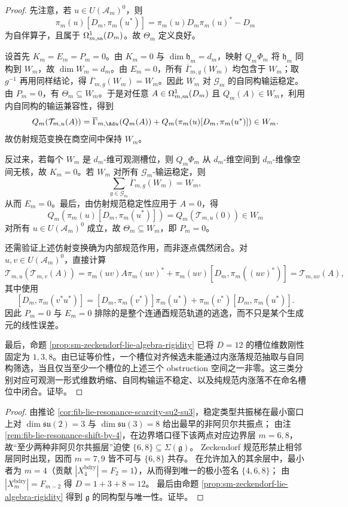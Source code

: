 \begin{proof}
先注意，若 \(u\in U(\mathcal A_m)^0\)，则
\[
\pi_m(u)[D_m,\pi_m(u^*)]
=\pi_m(u)D_m\pi_m(u)^*-D_m
\]
为自伴算子，且属于 \(\Omega^1_{m,{\rm sa}}(D_m)\)。故 \(\Theta_m\) 定义良好。

设首先 \(K_m=E_m=P_m=0\)。由 \(K_m=0\) 与 \(\dim\mathfrak h_m=d_m\)，映射 \(Q_m\Phi_m\) 将 \(\mathfrak h_m\) 同构到 \(W_m\)，故 \(\dim W_m=d_m\)。由 \(E_m=0\)，所有 \(\overline\Gamma_{m,g}(W_m)\) 均包含于 \(W_m\)；取 \(g^{-1}\) 再用同样结论，得 \(\overline\Gamma_{m,g}(W_m)=W_m\)。因此 \(W_m\) 对 \(\mathcal G_m\) 的自同构输运稳定。由 \(P_m=0\)，有 \(\Theta_m\subseteq W_m\)。于是对任意 \(A\in\Omega^1_{m,{\rm sa}}(D_m)\) 且 \(Q_m(A)\in W_m\)，利用内自同构的输运兼容性，得到
\[
Q_m(\mathcal T_{m,u}(A))
=\overline\Gamma_{m,\Ad u}(Q_m(A))+Q_m(\pi_m(u)[D_m,\pi_m(u^*)])\in W_m.
\]
故仿射规范变换在商空间中保持 \(W_m\)。

反过来，若每个 \(W_m\) 是 \(d_m\)-维可观测槽位，则 \(Q_m\Phi_m\) 从 \(d_m\)-维空间到 \(d_m\)-维像空间无核，故 \(K_m=0\)。若 \(W_m\) 对所有 \(\mathcal G_m\)-输运稳定，则
\[
\sum_{g\in\mathcal G_m}\overline\Gamma_{m,g}(W_m)=W_m,
\]
从而 \(E_m=0\)。最后，由仿射规范稳定性应用于 \(A=0\)，得
\[
Q_m(\pi_m(u)[D_m,\pi_m(u^*)])=Q_m(\mathcal T_{m,u}(0))\in W_m
\]
对所有 \(u\in U(\mathcal A_m)^0\) 成立，故 \(\Theta_m\subseteq W_m\)，即 \(P_m=0\)。

还需验证上述仿射变换确为内部规范作用，而非逐点偶然闭合。对 \(u,v\in U(\mathcal A_m)^0\)，直接计算
\[
\mathcal T_{m,u}(\mathcal T_{m,v}(A))
=\pi_m(uv)A\pi_m(uv)^*+\pi_m(uv)[D_m,\pi_m((uv)^*)]
=\mathcal T_{m,uv}(A),
\]
其中使用
\[
[D_m,\pi_m(v^*u^*)]=[D_m,\pi_m(v^*)]\pi_m(u^*)+\pi_m(v^*)[D_m,\pi_m(u^*)].
\]
因此 \(P_m=0\) 与 \(E_m=0\) 排除的是整个连通酉规范轨道的逃逸，而不只是某个生成元的线性误差。

最后，命题 \ref{prop:sm-zeckendorf-lie-algebra-rigidity} 已将 \(D=12\) 的槽位维数刚性固定为 \(1,3,8\)。由已证等价性，一个槽位对齐候选未能通过内涨落规范抽取与自同构筛选，当且仅当至少一个槽位的上述三个 obstruction 空间之一非零。这三类分别对应可观测一形式维数坍缩、自同构输运不稳定、以及纯规范内涨落不在命名槽位中闭合。证毕。
\end{proof}

\begin{proof}
由推论 \ref{cor:fib-lie-resonance-scarcity-su2-su3}，稳定类型共振梯在最小窗口上对 \(\dim\mathfrak{su}(2)=3\) 与 \(\dim\mathfrak{su}(3)=8\) 给出最早的非阿贝尔共振点；
由注 \ref{rem:fib-lie-resonance-shift-by-4}，在边界塔口径下该两点对应边界层 \(m=6,8\)，故“至少两种非阿贝尔共振层”迫使 \(\{6,8\}\subseteq\Sigma(\mathfrak g)\)。
Zeckendorf 规范形禁止相邻层同时出现，因而 \(m=7,9\) 皆不可与 \(\{6,8\}\) 共存。
在允许加入的其余层中，最小者为 \(m=4\)（贡献 \(|X_4^{\mathrm{bdry}}|=F_2=1\)），从而得到唯一的极小签名 \(\{4,6,8\}\)；
由 \(|X_m^{\mathrm{bdry}}|=F_{m-2}\) 得 \(D=1+3+8=12\)。
最后由命题 \ref{prop:sm-zeckendorf-lie-algebra-rigidity} 得到 \(\mathfrak g\) 的同构型与唯一性。证毕。
\end{proof}
